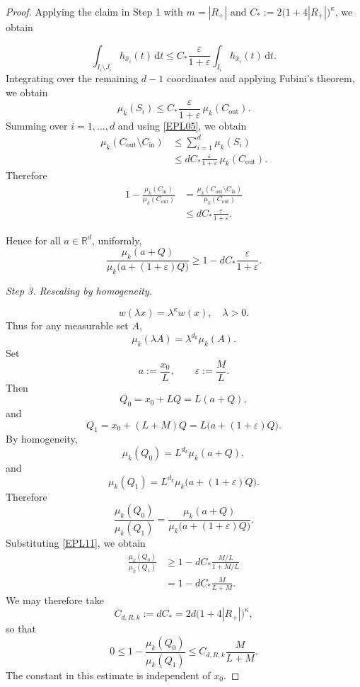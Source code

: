 \documentclass[12pt]{article}
\begin{document}
\begin{proof}
Applying the claim in Step 1 with $m=|R_+|$ and $C_* := 2\bigl(1+4|R_+|\bigr)^{\kappa}$, we obtain

\begin{equation}
\int_{I_i\setminus J_i} h_{\widehat{x}_i}(t)\,\mathrm{d}t
\le C_*\frac{\varepsilon}{1+\varepsilon}\int_{I_i} h_{\widehat{x}_i}(t)\,\mathrm{d}t.
\end{equation}
Integrating over the remaining $d-1$ coordinates and applying Fubini's theorem, we obtain
\begin{equation}
\mu_k(S_i)\le C_*\frac{\varepsilon}{1+\varepsilon}\,\mu_k(C_{\mathrm{out}}).
\end{equation}
Summing over $i=1,\dots,d$ and using \eqref{EPL05}, we obtain
\[
\begin{aligned}
\mu_k(C_{\mathrm{out}}\setminus C_{\mathrm{in}})
&\le \sum_{i=1}^{d}\mu_k(S_i) \\
&\le d C_*\frac{\varepsilon}{1+\varepsilon}\,\mu_k(C_{\mathrm{out}}).
\end{aligned}
\]
Therefore
\[
\begin{aligned}
1-\frac{\mu_k(C_{\mathrm{in}})}{\mu_k(C_{\mathrm{out}})}
&=\frac{\mu_k(C_{\mathrm{out}}\setminus C_{\mathrm{in}})}{\mu_k(C_{\mathrm{out}})} \\
&\le d C_*\frac{\varepsilon}{1+\varepsilon}.
\end{aligned}
\]

Hence for all $a\in\mathbb{R}^d$, uniformly,
\begin{equation}\label{EPL11}
\frac{\mu_k(a+Q)}{\mu_k\bigl(a+(1+\varepsilon)Q\bigr)}
\ge 1- d C_*\frac{\varepsilon}{1+\varepsilon}.
\end{equation}


\emph{Step 3. Rescaling by homogeneity.}

\[
w(\lambda x)=\lambda^{\kappa} w(x),\quad \lambda>0.
\]
Thus for any measurable set $A$,
\[
\mu_k(\lambda A)=\lambda^{d_k}\mu_k(A).
\]
Set
\[
a:=\frac{x_0}{L},\qquad \varepsilon:=\frac{M}{L}.
\]
Then
\[
Q_0=x_0+LQ=L(a+Q),
\]
and
\[
Q_1=x_0+(L+M)Q=L\bigl(a+(1+\varepsilon)Q\bigr).
\]
By homogeneity,
\[
\mu_k(Q_0)=L^{d_k}\mu_k(a+Q),
\]
and
\[
\mu_k(Q_1)=L^{d_k}\mu_k\bigl(a+(1+\varepsilon)Q\bigr).
\]
Therefore
\[
\frac{\mu_k(Q_0)}{\mu_k(Q_1)}
=\frac{\mu_k(a+Q)}{\mu_k\bigl(a+(1+\varepsilon)Q\bigr)}.
\]
Substituting \eqref{EPL11}, we obtain
\begin{equation}\label{EPL15}
\begin{aligned}
\frac{\mu_k(Q_0)}{\mu_k(Q_1)}
&\ge 1- d C_*\frac{M/L}{1+M/L} \\
&=1- d C_*\frac{M}{L+M}.
\end{aligned}
\end{equation}
We may therefore take
\[
C_{d,R,k}:= d C_* = 2d\bigl(1+4|R_+|\bigr)^{\kappa},
\]
so that
\[
0\le 1-\frac{\mu_k(Q_0)}{\mu_k(Q_1)}
\le C_{d,R,k}\frac{M}{L+M}.
\]
The constant in this estimate is independent of $x_0$.


\end{proof}
\end{document}
